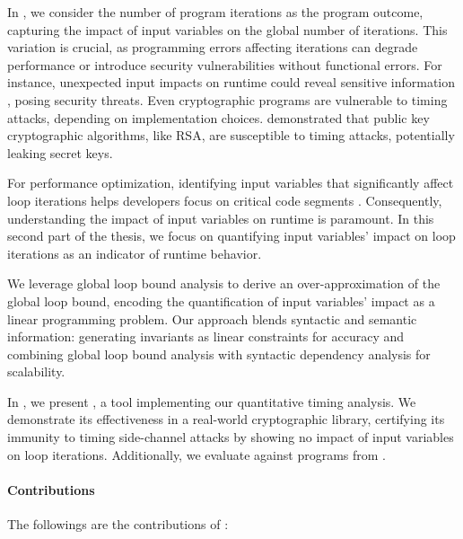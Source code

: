 In , we consider the number of program iterations as the program outcome, capturing the impact of input variables on the global number of iterations.
This variation is crucial, as programming errors affecting iterations can degrade performance or introduce security vulnerabilities without functional errors.
For instance, unexpected input impacts on runtime could reveal sensitive information , posing security threats.
Even cryptographic programs are vulnerable to timing attacks, depending on implementation choices.
 demonstrated that public key cryptographic algorithms, like RSA, are susceptible to timing attacks, potentially leaking secret keys.

For performance optimization, identifying input variables that significantly affect loop iterations helps developers focus on critical code segments .
Consequently, understanding the impact of input variables on runtime is paramount.
In this second part of the thesis, we focus on quantifying input variables' impact on loop iterations as an indicator of runtime behavior.

We leverage global loop bound analysis to derive an over-approximation of the global loop bound, encoding the quantification of input variables' impact as a linear programming problem.
Our approach blends syntactic and semantic information: generating invariants as linear constraints for accuracy and combining global loop bound analysis with syntactic dependency analysis  for scalability.

In , we present \timesec,\sidenote{\timesecurl} a tool implementing our quantitative timing analysis.
We demonstrate its effectiveness in a real-world cryptographic library, certifying its immunity to timing side-channel attacks by showing no impact of input variables on loop iterations.
Additionally, we evaluate \timesec{} against programs from \svcomp.


\paragraph{Contributions}

The followings are the contributions of :

